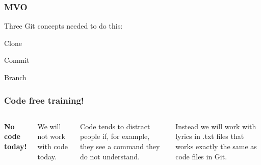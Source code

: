 \documentclass[aspectratio=169]{beamer} %
\begin{document}
\begin{frame}
\frametitle{MVO}

	\hspace*{2.5cm}\Large{Three Git concepts needed to do this:}

	\begin{itemize}
		\setlength{\itemindent}{3cm}
		\Large{\item Clone}
		\Large{\item Commit}
		\Large{\item Branch}
	\end{itemize}

\end{frame}


\begin{frame}
\frametitle{Code free training!}

	\begin{columns}[c]


		\textbf{No code today!}

		\vspace{.5cm}

		We will not work with code today.

		\vspace{.25cm}

		Code tends to distract people if, for example, they see a command they do not understand.

		\vspace{.25cm}

		Instead we will work with lyrics in .txt files that works exactly the same as code files in Git.


	\end{columns}
\end{frame}
\end{document}
